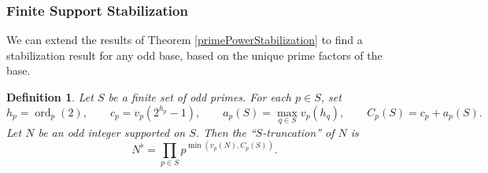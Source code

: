 \documentclass[a4paper]{article}
\newtheorem{definition}[theorem]{Definition}
\newcommand{\ord}[2][]{\operatorname{ord}_{#1}\!\left( #2 \right)}
\begin{document}
	\subsubsection{Finite Support Stabilization}
	We can extend the results of Theorem \ref{primePowerStabilization} to find a stabilization result for any odd base, based on the unique prime factors of the base.
	
	\begin{definition}
		Let $S$ be a finite set of odd primes.
		For each $p \in S$, set
		\begin{equation}\label{finiteSupportVariables}
			h_p = \ord[p]{2}, \qquad c_p = v_p(2^{h_p}-1), \qquad a_p(S) = \max_{q\in S}{v_p(h_q)}, \qquad C_p(S) = c_p + a_p(S).
		\end{equation}
		Let $N$ be an odd integer supported on $S$.
		Then the ``$S$-truncation'' of $N$ is
		\begin{equation}\label{S-truncation}
			N^\flat = \prod_{p \in S}{p^{\min{\left(v_p(N), C_p(S)\right)}}}.
		\end{equation}
	\end{definition}
	
\end{document}
